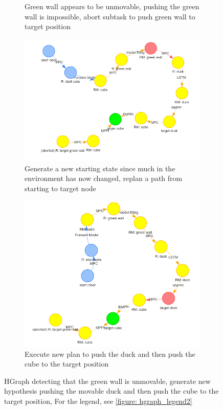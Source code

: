 \begin{figure}[H]
\begin{subfigure}[b]{0.49\textwidth}
         \caption{Green wall appears to be unmovable, pushing the green wall is impossible, abort subtask to push green wall to target position}
     \end{subfigure}

     \begin{subfigure}[b]{0.49\textwidth}
         \centering
         \includegraphics[width=\textwidth]{figures/blockade/7.png}
         \caption{Generate a new starting state since much in the environment has now changed, replan a path from starting to target node}
     \end{subfigure}
     \hfill
     \begin{subfigure}[b]{0.49\textwidth}
         \centering
         \includegraphics[width=\textwidth]{figures/blockade/8.png}
         \caption{Execute new plan to push the duck and then push the cube to the target position}
     \end{subfigure}
     \caption{HGraph detecting that the green wall is unmovable, generate new hypothesis pushing the movable duck and then push the cube to the target position, For the legend, see \cref{figure: hgraph_legend2}}
     \label{figure: blockade_hgraph_second}
\end{figure}

